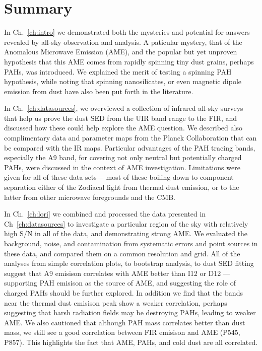 \chapter{Summary}
  \label{ch:Summary}

  In Ch.~\ref{ch:intro} we demonstrated both the mysteries and potential for answers revealed by all-sky observation and analysis. A paticular mystery, that of the Anomalous Microwave Emission (AME), and the popular but yet unproven hypothesis that this AME comes from rapidly spinning tiny dust grains, perhaps PAHs, was introduced. We explained the merit of testing a spinning PAH hypothesis, while noting that spinning nanosilicates, or even magnetic dipole emission from dust have also been put forth in the literature.

  In Ch.~\ref{ch:datasources}, we overviewed a collection of infrared all-sky surveys that help us prove the dust SED from the UIR band range to the FIR, and discussed how these could help explore the AME question. We described also complimentary data and parameter maps from the Planck Collaboration that can be compared with the IR maps. Particular advantages of the PAH tracing bands, especially the A9 band, for covering not only neutral but potentially charged PAHs, were discussed in the context of AME investigation. Limitations were given for all of these data sets--- most of these boiling-down to component separation either of the Zodiacal light from thermal dust emission, or to the latter from other microwave foregrounds and the CMB.

  In Ch.~\ref{ch:lori} we combined and processed the data presented in Ch~\ref{ch:datasources} to investigate a particular region of the sky with relatively high S/N in all of the data, and demonstrating strong AME. We evaluated the background, noise, and contamination from systematic errors and point sources in these data, and compared them on a common resolution and grid. All of the analyses from simple correlation plots, to bootstrap analysis, to dust SED fitting suggest that A9 emisison correlates with AME better than I12 or D12 --- supporting PAH emisison as the source of AME, and suggesting the role of charged PAHs should be further explored. In addition we find that the bands near the thermal dust emisison peak show a weaker correlation, perhaps suggesting that harsh radiation fields may be destroying PAHs, leading to weaker AME. We also cautioned that although PAH mass correlates better than dust mass, we still see a good correlation between FIR emisison and AME (P545, P857). This highlights the fact that AME, PAHs, and cold dust are all correlated.

